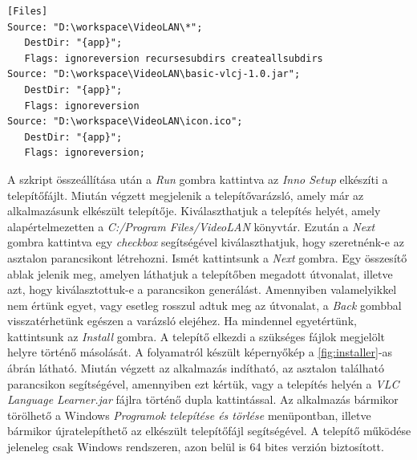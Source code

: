 \begin{spacing}{1.25}
\begin{lstlisting}[caption=Telepítőhöz szükséges fájlok, label={lst:files}]
[Files]
Source: "D:\workspace\VideoLAN\*";
   DestDir: "{app}";
   Flags: ignoreversion recursesubdirs createallsubdirs
Source: "D:\workspace\VideoLAN\basic-vlcj-1.0.jar";
   DestDir: "{app}";
   Flags: ignoreversion
Source: "D:\workspace\VideoLAN\icon.ico";
   DestDir: "{app}";
   Flags: ignoreversion;
\end{lstlisting}
\end{spacing}

A szkript összeállítása után a \textit{Run} gombra kattintva az \textit{Inno Setup} elkészíti a telepítőfájlt. Miután végzett megjelenik a telepítővarázsló, amely már az alkalmazásunk elkészült telepítője. Kiválaszthatjuk a telepítés helyét, amely alapértelmezetten a \textit{C:/Program Files/VideoLAN} könyvtár. Ezután a \textit{Next} gombra kattintva egy \textit{checkbox} segítségével kiválaszthatjuk, hogy szeretnénk-e az asztalon parancsikont létrehozni. Ismét kattintsunk a \textit{Next} gombra. Egy összesítő ablak jelenik meg, amelyen láthatjuk a telepítőben megadott útvonalat, illetve azt, hogy kiválasztottuk-e a parancsikon generálást. Amennyiben valamelyikkel nem értünk egyet, vagy esetleg rosszul adtuk meg az útvonalat, a \textit{Back} gombbal visszatérhetünk egészen a varázsló elejéhez. Ha mindennel egyetértünk, kattintsunk az \textit{Install} gombra. A telepítő elkezdi a szükséges fájlok megjelölt helyre történő másolását. A folyamatról készült képernyőkép a \ref{fig:installer}-as ábrán látható. Miután végzett az alkalmazás indítható, az asztalon található parancsikon segítségével, amennyiben ezt kértük, vagy a telepítés helyén a \textit{VLC Language Learner.jar} fájlra történő dupla kattintással. Az alkalmazás bármikor törölhető a Windows \textit{Programok telepítése és törlése} menüpontban, illetve bármikor újratelepíthető az elkészült telepítőfájl segítségével. A telepítő működése jeleneleg csak Windows rendszeren, azon belül is 64 bites verzión biztosított.